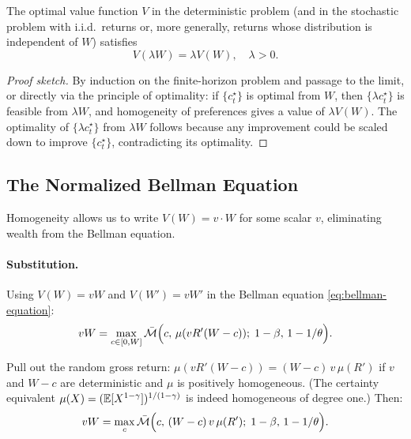 \begin{proposition}
\label{prop:V-homogeneous}
The optimal value function $V$ in the deterministic problem (and in the stochastic problem with i.i.d.\ returns or, more generally, returns whose distribution is independent of $W$) satisfies
\begin{equation}
V(\lambda W) = \lambda V(W), \quad \lambda > 0.
\label{eq:V-homogeneous}
\end{equation}
\end{proposition}

\begin{proof}[Proof sketch]
By induction on the finite-horizon problem and passage to the limit, or directly via the principle of optimality: if $\{c_t^\star\}$ is optimal from $W$, then $\{\lambda c_t^\star\}$ is feasible from $\lambda W$, and homogeneity of preferences gives a value of $\lambda V(W)$. The optimality of $\{\lambda c_t^\star\}$ from $\lambda W$ follows because any improvement could be scaled down to improve $\{c_t^\star\}$, contradicting its optimality.
\end{proof}

\subsection{The Normalized Bellman Equation}
\label{subsec:dp-normalized-bellman}

Homogeneity allows us to write $V(W) = v \cdot W$ for some scalar $v$, eliminating wealth from the Bellman equation.

\paragraph{Substitution.}
Using $V(W) = v W$ and $V(W') = v W'$ in the Bellman equation \cref{eq:bellman-equation}:
\begin{equation}
v W = \max_{c \in [0, W]} \bar{\mathcal{M}}\Big( c, \, \mu(v R'(W - c)); \; 1-\beta, \, 1-1/\theta \Big).
\label{eq:bellman-vW}
\end{equation}

Pull out the random gross return: $\mu(v R'(W-c)) = (W-c) \, v \, \mu(R')$ if $v$ and $W-c$ are deterministic and $\mu$ is positively homogeneous. (The certainty equivalent $\mu(X) = (\mathbb{E}[X^{1-\gamma}])^{1/(1-\gamma)}$ is indeed homogeneous of degree one.) Then:
\begin{equation}
v W = \max_{c} \bar{\mathcal{M}}\Big( c, \, (W-c) \, v \, \mu(R'); \; 1-\beta, \, 1-1/\theta \Big).
\label{eq:bellman-pulled}
\end{equation}

